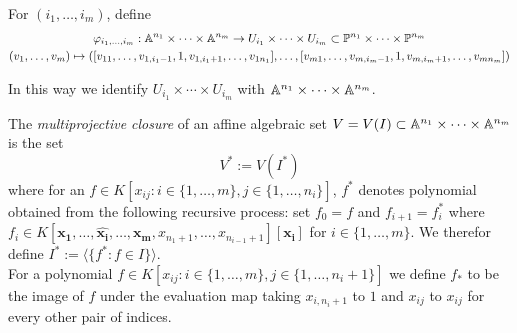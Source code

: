         \begin{definition}
            For $(i_1,\dots,i_m)$, define 
            \begin{gather*}
                \varphi_{i_1,\dots,i_m} : \mathbb{A}^{n_1}\times\cdots\times \mathbb{A}^{n_m}\rightarrow U_{i_1}\times\cdots\times U_{i_m}\subset \mathbb{P}^{n_1}\times\cdots\times\mathbb{P}^{n_m}\\
                (v_1,\dots,v_m)\mapsto ([v_{11},\dots,v_{1,i_1-1},1,v_{1,i_1+1},\dots,v_{1n_1}],\dots,[v_{m1},\dots,v_{m,i_m-1},1,v_{m,i_m+1},\dots,v_{mn_m}])
            \end{gather*}
        \end{definition}
        \begin{remark}
            In this way we identify $U_{i_1}\times\cdots\times U_{i_m}$ with $\mathbb{A}^{n_1}\times\cdots\times\mathbb{A}^{n_m}$. 
        \end{remark}
        \begin{definition}
            The \textit{multiprojective closure} of an affine algebraic set $V=V(I)\subset \mathbb{A}^{n_1}\times\cdots\times\mathbb{A}^{n_m}$ is the set 
            $$V^\ast:=V(I^\ast)$$
            where for an $f\in K[x_{ij}: i\in\{1,\dots,m\}, j\in\{1,\dots,n_i\}]$, $f^\ast$ denotes polynomial obtained from the following recursive process: set $f_0 =f$ and $f_{i+1} = f_{i}^\ast$ where $f_{i}\in K[\mathbf{x_1},\dots,\widehat{\mathbf{x_i}},\dots,\mathbf{x_m},x_{n_1+1},\dots,x_{n_{i-1}+1}][\mathbf{x_i}]$ for $i\in\{1,\dots,m\}$. We therefor define $I^\ast := \langle \{f^\ast : f \in I\}\rangle$.\\
            For a polynomial $f\in K[x_{ij}:i\in\{1,\dots,m\},j\in\{1,\dots,n_i+1\}]$ we define $f_\ast$ to be the image of $f$ under the evaluation map taking $x_{i,n_i+1}$ to $1$ and $x_{ij}$ to $x_{ij}$ for every other pair of indices.
        \end{definition}
